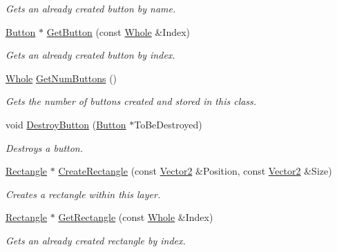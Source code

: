 \begin{DoxyCompactItemize}
\begin{DoxyCompactList}\small\item\em Gets an already created button by name. \item\end{DoxyCompactList}\item 
\hyperlink{classphys_1_1UI_1_1Button}{Button} $\ast$ \hyperlink{classphys_1_1UI_1_1Layer_a96d3a5d016d435878c0184d02c839089}{GetButton} (const \hyperlink{namespacephys_a460f6bc24c8dd347b05e0366ae34f34a}{Whole} \&Index)
\begin{DoxyCompactList}\small\item\em Gets an already created button by index. \item\end{DoxyCompactList}\item 
\hyperlink{namespacephys_a460f6bc24c8dd347b05e0366ae34f34a}{Whole} \hyperlink{classphys_1_1UI_1_1Layer_acebe9d678fe60e02fa4d37647bb9780c}{GetNumButtons} ()
\begin{DoxyCompactList}\small\item\em Gets the number of buttons created and stored in this class. \item\end{DoxyCompactList}\item 
void \hyperlink{classphys_1_1UI_1_1Layer_ac011ff1dd631287500f5b2aff43726e3}{DestroyButton} (\hyperlink{classphys_1_1UI_1_1Button}{Button} $\ast$ToBeDestroyed)
\begin{DoxyCompactList}\small\item\em Destroys a button. \item\end{DoxyCompactList}\item 
\hyperlink{classphys_1_1UI_1_1Rectangle}{Rectangle} $\ast$ \hyperlink{classphys_1_1UI_1_1Layer_a0bbeb9de6fce3087afc2f569f2a7d6db}{CreateRectangle} (const \hyperlink{classphys_1_1Vector2}{Vector2} \&Position, const \hyperlink{classphys_1_1Vector2}{Vector2} \&Size)
\begin{DoxyCompactList}\small\item\em Creates a rectangle within this layer. \item\end{DoxyCompactList}\item 
\hyperlink{classphys_1_1UI_1_1Rectangle}{Rectangle} $\ast$ \hyperlink{classphys_1_1UI_1_1Layer_ac96bb33f2c47d3ab1b615fc91aa5ad91}{GetRectangle} (const \hyperlink{namespacephys_a460f6bc24c8dd347b05e0366ae34f34a}{Whole} \&Index)
\begin{DoxyCompactList}\small\item\em Gets an already created rectangle by index. \item\end{DoxyCompactList}\item 

\end{DoxyCompactItemize}
